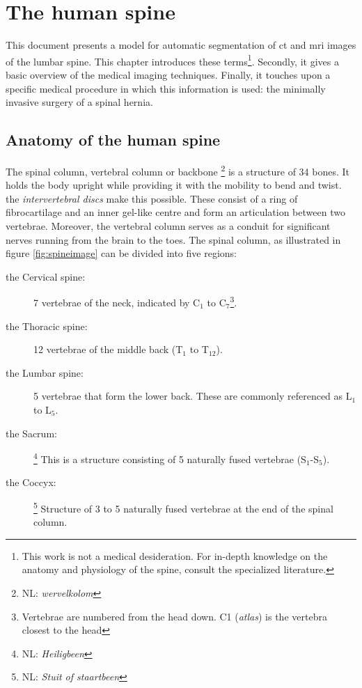 \chapter{The human spine}
\par{
    This document presents a model for automatic segmentation of \acrfull{ct} and \acrfull{mri} images of the lumbar spine.
    This chapter introduces these terms\footnote{This work is not a medical desideration. For in-depth knowledge on the anatomy and physiology of the spine, consult the specialized literature.}.
    Secondly, it gives a basic overview of the medical imaging techniques. 
    Finally, it touches upon a specific medical procedure in which this information is used: the minimally invasive surgery of a spinal hernia.
}



\section{Anatomy of the human spine}

\par{
    The spinal column, vertebral column or backbone \footnote{NL: \textit{wervelkolom}} is a structure of 34 bones. 
    It holds the body upright while providing it with the mobility to bend and twist.
    the \textit{intervertebral discs} make this possible. These consist of a ring of fibrocartilage and an inner gel-like centre and form an articulation between two vertebrae.
    Moreover, the vertebral column serves as a conduit for significant nerves running from the brain to the toes.
    The spinal column, as illustrated in figure \ref{fig:spineimage} can be divided into five regions:
}

\begin{description}
    \item[the Cervical spine:] 7 vertebrae of the neck, indicated by C$_1$ to C$_7$\footnote{Vertebrae are numbered from the head down. C1 (\textit{atlas}) is the vertebra closest to the head}.
    \item[the Thoracic spine:] 12 vertebrae of the middle back (T$_1$ to T$_{12}$).
    \item[the Lumbar spine:] 5 vertebrae that form the lower back. These are commonly referenced as L$_1$ to L$_5$.
    \item[the Sacrum:]\footnote{NL: \textit{Heiligbeen}} This is a structure consisting of 5 naturally fused vertebrae (S$_1$-S$_5$).
    \item[the Coccyx:]\footnote{NL: \textit{Stuit of staartbeen}} Structure of 3 to 5 naturally fused vertebrae at the end of the spinal column.
\end{description}


